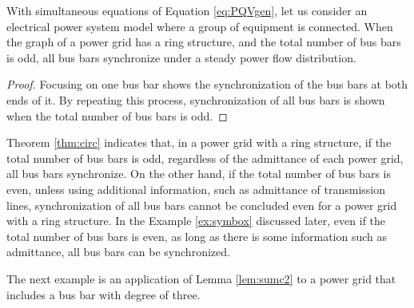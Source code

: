 \documentclass[graybox, envcountchap]{svmult}
\begin{document}
\begin{theorem}
\label{thm:circ}
With simultaneous equations of Equation \ref{eq:PQVgen}, let us consider an electrical power system model where a group of equipment is connected.
When the graph of a power grid has a ring structure, and the total number of bus bars is odd, all bus bars synchronize under a steady power flow distribution.
\end{theorem}

\begin{proof}
Focusing on one bus bar shows the synchronization of the bus bars at both ends of it.
By repeating this process, synchronization of all bus bars is shown when the total number of bus bars is odd.
\end{proof}


Theorem \ref{thm:circ} indicates that, in a power grid with a ring structure, if the total number of bus bars is odd, regardless of the admittance of each power grid, all bus bars synchronize.
On the other hand, if the total number of bus bars is even, unless using additional information, such as admittance of transmission lines, synchronization of all bus bars cannot be concluded even for a power grid with a ring structure.
In the Example \ref{ex:symbox} discussed later, even if the total number of bus bars is even, as long as there is some information such as admittance, all bus bars can be synchronized. 

The next example is an application of Lemma \ref{lem:sumc2} to a power grid that includes a bus bar with degree of three.
\end{document}
